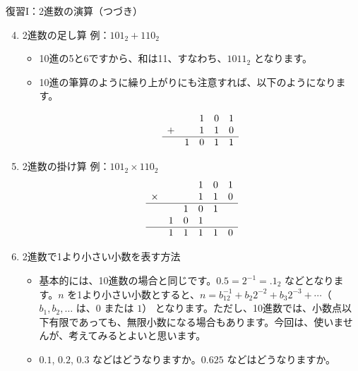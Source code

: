 \documentclass[10pt, dvipdfmx]{beamer}
\begin{document}
\begin{frame}{復習I：2進数の演算（つづき）}
\begin{enumerate}
\setcounter{enumi}{3}
\item  2進数の足し算 例：\(101_2 + 110_2\)  
\begin{itemize}
    \item 10進の5と6ですから、和は11、すなわち、\(1011_2\) となります。
    \item 10進の筆算のように繰り上がりにも注意すれば、以下のようになります。

\[ \begin{array}{ccccc} &  & 1  & 0  & 1 \\ +  &  & 1  & 1  & 0 \\ \hline  & 1  & 0  & 1  & 1 \end{array} \]
\end{itemize}
\item  2進数の掛け算 例：\(101_2 \times 110_2\)  
\[ \begin{array}{cccccc}  &  &  & 1  & 0  & 1 \\ \times  &  &  & 1  & 1  & 0\\ \hline  &  & 1  & 0  & 1  & \\  & 1  & 0  & 1  &  & \\ \hline  & 1  & 1  & 1  & 1  & 0 \end{array} \]

\item 2進数で1より小さい小数を表す方法
\begin{itemize}
    \item 基本的には、10進数の場合と同じです。\(0.5 = 2^{-1}= .1_2\) などとなります。\(n\) を1より小さい小数とすると、\(n = b_12^{-1} + b_2 2^{-2} + b_3 2^{-3} + \cdots\)（\(b_1, b_2, \ldots\) は、\(0\) または \(1\)） となります。ただし、10進数では、小数点以下有限であっても、無限小数になる場合もあります。今回は、使いませんが、考えてみるとよいと思います。
    \item \(0.1\), \(0.2\), \(0.3\) などはどうなりますか。\(0.625\) などはどうなりますか。
\end{itemize}
\end{enumerate}
\end{frame}
\end{document}
